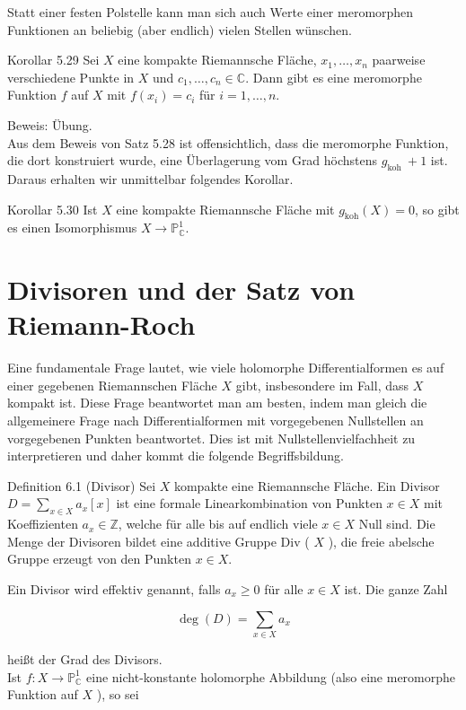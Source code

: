 \documentclass[10pt, letterpaper]{article}
\begin{document}
Statt einer festen Polstelle kann man sich auch Werte einer meromorphen Funktionen an beliebig (aber endlich) vielen Stellen wünschen.

Korollar 5.29 Sei $X$ eine kompakte Riemannsche Fläche, $x_{1}, \ldots, x_{n}$ paarweise verschiedene Punkte in $X$ und $c_{1}, \ldots, c_{n} \in \mathbb{C}$. Dann gibt es eine meromorphe Funktion $f$ auf $X$ mit $f\left(x_{i}\right)=c_{i}$ für $i=1, \ldots, n$.

Beweis: Übung.\\
Aus dem Beweis von Satz 5.28 ist offensichtlich, dass die meromorphe Funktion, die dort konstruiert wurde, eine Überlagerung vom Grad höchstens $g_{\text {koh }}+1$ ist. Daraus erhalten wir unmittelbar folgendes Korollar.

Korollar 5.30 Ist $X$ eine kompakte Riemannsche Fläche mit $g_{\mathrm{koh}}(X)=0$, so gibt es einen Isomorphismus $X \rightarrow \mathbb{P}_{\mathbb{C}}^{1}$.

\section {Divisoren und der Satz von Riemann-Roch}
Eine fundamentale Frage lautet, wie viele holomorphe Differentialformen es auf einer gegebenen Riemannschen Fläche $X$ gibt, insbesondere im Fall, dass $X$ kompakt ist. Diese Frage beantwortet man am besten, indem man gleich die allgemeinere Frage nach Differentialformen mit vorgegebenen Nullstellen an vorgegebenen Punkten beantwortet. Dies ist mit Nullstellenvielfachheit zu interpretieren und daher kommt die folgende Begriffsbildung.

Definition 6.1 (Divisor) Sei $X$ kompakte eine Riemannsche Fläche. Ein Divisor $D=\sum_{x \in X} a_{x}[x]$ ist eine formale Linearkombination von Punkten $x \in X$ mit Koeffizienten $a_{x} \in \mathbb{Z}$, welche für alle bis auf endlich viele $x \in X$ Null sind. Die Menge der Divisoren bildet eine additive Gruppe Div ( $X$ ), die freie abelsche Gruppe erzeugt von den Punkten $x \in X$.

Ein Divisor wird effektiv genannt, falls $a_{x} \geq 0$ für alle $x \in X$ ist. Die ganze Zahl

$$
\operatorname{deg}(D)=\sum_{x \in X} a_{x}
$$

heißt der Grad des Divisors.\\
Ist $f: X \longrightarrow \mathbb{P}_{\mathbb{C}}^{1}$ eine nicht-konstante holomorphe Abbildung (also eine meromorphe Funktion auf $X$ ), so sei
\end{document}
